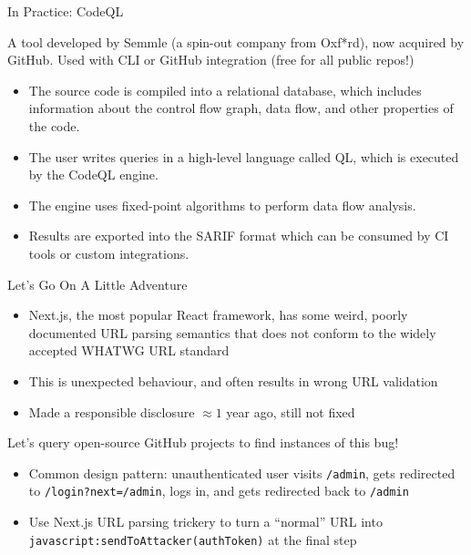 \documentclass[aspectratio=169,xcolor=dvipsnames]{beamer}
\begin{document}
\begin{frame}{In Practice: CodeQL}

	A tool developed by Semmle (a spin-out company from Oxf*rd), now acquired by
	GitHub. Used with CLI or GitHub integration (free for all public repos!)
	\bigskip

	\begin{itemize}
		\item The source code is compiled into a relational database, which includes
		      information about the control flow graph, data flow, and other properties of
		      the code.
		\item The user writes queries in a high-level language called QL, which is executed
		      by the CodeQL engine.
		\item The engine uses fixed-point algorithms to perform data flow analysis.
		\item Results are exported into the SARIF format which can be consumed by CI tools or
		      custom integrations.
	\end{itemize}
\end{frame}

\begin{frame}[fragile]{Let's Go On A Little Adventure}
	\begin{itemize}
		\item Next.js, the most popular React framework, has some weird, poorly documented
		      URL parsing semantics that does not conform to the widely accepted WHATWG URL
		      standard
		\item This is unexpected behaviour, and often results in wrong URL validation
		\item Made a responsible disclosure $\approx 1$ year ago, still not fixed \end{itemize}
	\bigskip
	Let's query open-source GitHub projects to find instances of this bug!
	\bigskip
	\begin{itemize}
		\item Common design pattern: unauthenticated user visits \verb|/admin|, gets
		      redirected to \verb|/login?next=/admin|, logs in, and gets redirected back to
		      \verb|/admin|
		\item Use Next.js URL parsing trickery to turn a ``normal'' URL into
		      \verb|javascript:sendToAttacker(authToken)| at the final step
	\end{itemize}
\end{frame}
\end{document}
